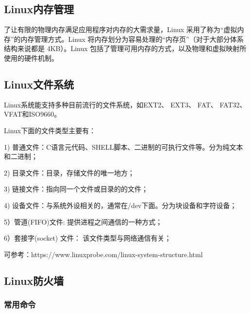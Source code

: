 \documentclass[UTF8]{article}%
\begin{document}
\subsection{Linux内存管理}

了让有限的物理内存满足应用程序对内存的大需求量，Linux 采用了称为“虚拟内存”的内存管理方式。Linux 将内存划分为容易处理的“内存页”（对于大部分体系结构来说都是 4KB）。Linux 包括了管理可用内存的方式，以及物理和虚拟映射所使用的硬件机制。

\subsection{Linux文件系统}

Linux系统能支持多种目前流行的文件系统，如EXT2、 EXT3、 FAT、 FAT32、 VFAT和ISO9660。

Linux下面的文件类型主要有：

1) 普通文件：C语言元代码、SHELL脚本、二进制的可执行文件等。分为纯文本和二进制；

2) 目录文件：目录，存储文件的唯一地方；

3) 链接文件：指向同一个文件或目录的的文件；

4) 设备文件：与系统外设相关的，通常在/dev下面。分为块设备和字符设备；

5）管道(FIFO)文件: 提供进程之间通信的一种方式；

6）套接字(socket) 文件： 该文件类型与网络通信有关；

可参考：https://www.linuxprobe.com/linux-system-structure.html

\subsection{Linux防火墙}

\subsubsection{常用命令}
\end{document}
